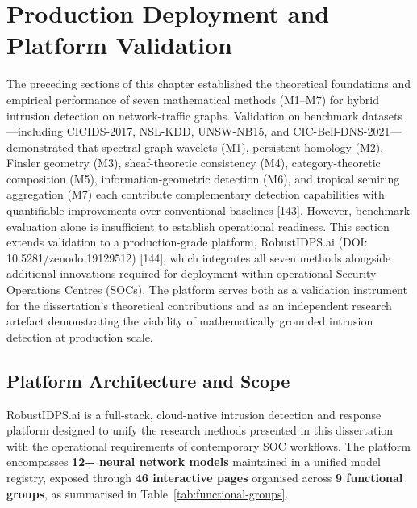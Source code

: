 \documentclass[12pt,a4paper]{article}
\begin{document}

\section{Production Deployment and Platform Validation}
\label{sec:platform-validation}

The preceding sections of this chapter established the theoretical
foundations and empirical performance of seven mathematical methods
(M1--M7) for hybrid intrusion detection on network-traffic graphs.
Validation on benchmark datasets---including CICIDS-2017, NSL-KDD,
UNSW-NB15, and CIC-Bell-DNS-2021---demonstrated that spectral graph
wavelets (M1), persistent homology (M2), Finsler geometry (M3),
sheaf-theoretic consistency (M4), category-theoretic composition (M5),
information-geometric detection (M6), and tropical semiring
aggregation (M7) each contribute complementary detection capabilities
with quantifiable improvements over conventional baselines [143].
However, benchmark evaluation alone is insufficient to establish
operational readiness. This section extends validation to a
production-grade platform, RobustIDPS.ai (DOI:
10.5281/zenodo.19129512) [144], which integrates all seven methods
alongside additional innovations required for deployment within
operational Security Operations Centres (SOCs). The platform serves
both as a validation instrument for the dissertation's theoretical
contributions and as an independent research artefact demonstrating
the viability of mathematically grounded intrusion detection at
production scale.

\subsection{Platform Architecture and Scope}
\label{subsec:platform-architecture}

RobustIDPS.ai is a full-stack, cloud-native intrusion detection and
response platform designed to unify the research methods presented in
this dissertation with the operational requirements of contemporary
SOC workflows. The platform encompasses \textbf{12+ neural network
models} maintained in a unified model registry, exposed through
\textbf{46 interactive pages} organised across \textbf{9 functional
groups}, as summarised in Table~\ref{tab:functional-groups}.
\end{document}
